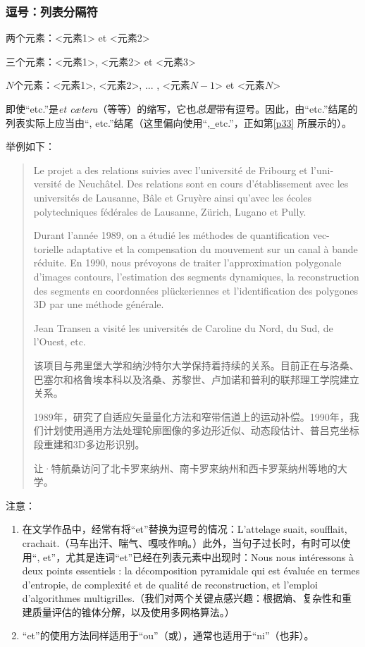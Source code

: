 \begin{mdframed}
    \subsubsection*{逗号：列表分隔符}

    \noindent 两个元素：<元素1> et <元素2>

    \noindent 三个元素：<元素1>, <元素2> et <元素3>

    \noindent $N$个元素：<元素1>, <元素2>, ... , <元素$N-1$> et <元素$N$>
\end{mdframed}

即使“etc.”是\emph{et cætera}（等等）的缩写，它也\emph{总是}带有逗号。因此，由“etc.”结尾的列表实际上应当由“, etc.”结尾（这里偏向使用“,\verb|_|etc.”，正如第\ref{p33}%
所展示的）。

举例如下：

\begin{quote}
    Le projet a des relations suivies avec l’université de Fribourg et l’uni- versité de Neuchâtel. Des relations sont en cours d’établissement avec les universités de Lausanne, Bâle et Gruyère ainsi qu’avec les écoles polytechniques fédérales de Lausanne, Zürich, Lugano et Pully.

    Durant l’année 1989, on a étudié les méthodes de quantification vec- torielle adaptative et la compensation du mouvement sur un canal à bande réduite. En 1990, nous prévoyons de traiter l’approximation polygonale d’images contours, l’estimation des segments dynamiques, la reconstruction des segments en coordonnées plückeriennes et l’identification des polygones 3D par une méthode générale.

    Jean Transen a visité les universités de Caroline du Nord, du Sud, de l’Ouest, etc.

    \begin{bil}
        该项目与弗里堡大学和纳沙特尔大学保持着持续的关系。目前正在与洛桑、巴塞尔和格鲁埃本科以及洛桑、苏黎世、卢加诺和普利的联邦理工学院建立关系。

        1989年，研究了自适应矢量量化方法和窄带信道上的运动补偿。1990年，我们计划使用通用方法处理轮廓图像的多边形近似、动态段估计、普吕克坐标段重建和3D多边形识别。

        让·特航桑访问了北卡罗来纳州、南卡罗来纳州和西卡罗莱纳州等地的大学。
    \end{bil}
\end{quote}

注意：

\begin{enumerate}
    \item 在文学作品中，经常有将“et”替换为逗号的情况：L’attelage suait, soufflait, crachait.（马车出汗、喘气、嘎吱作响。）此外，当句子过长时，有时可以使用“, et”，尤其是连词“et”已经在列表元素中出现时：Nous nous intéressons à deux points essentiels : la décomposition pyramidale qui est évaluée en termes d’entropie, de complexité et de qualité de reconstruction, et l’emploi d’algorithmes multigrilles.（我们对两个关键点感兴趣：根据熵、复杂性和重建质量评估的锥体分解，以及使用多网格算法。）
    \item “et”的使用方法同样适用于“ou”（或），通常也适用于“ni”（也非）。
\end{enumerate}

